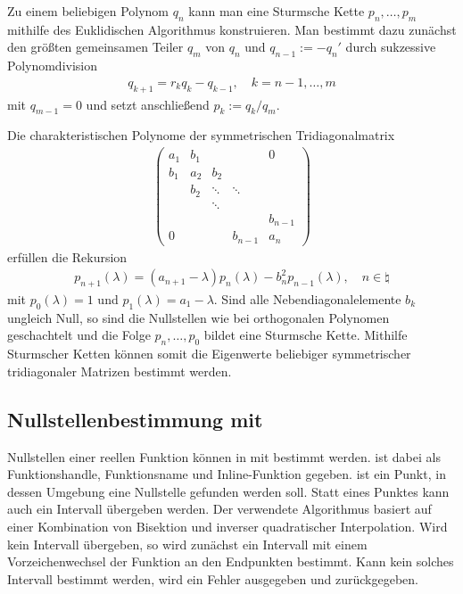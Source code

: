 \linie

Zu einem beliebigen Polynom $q_n$ kann man eine Sturmsche Kette
$p_n, \dotsc, p_m$ mithilfe des Euklidischen Algorithmus konstruieren.
Man bestimmt dazu zunächst den größten gemeinsamen Teiler $q_m$ von $q_n$
und $q_{n-1} := -q_n'$ durch sukzessive Polynomdivision
\begin{align*}
    q_{k+1} = r_k q_k - q_{k-1}, \quad
    k = n - 1, \dotsc, m
\end{align*}
mit $q_{m-1} = 0$ und setzt anschließend $p_k := q_k / q_m$.

\linie

Die charakteristischen Polynome der symmetrischen Tridiagonalmatrix
\begin{align*}
    \begin{pmatrix}
        a_1 & b_1 & & & 0 \\
        b_1 & a_2 & b_2 \\
        & b_2 & \ddots & \ddots \\
        & & \ddots \\
        & & & & b_{n-1} \\
        0 & & & b_{n-1} & a_n
    \end{pmatrix}
\end{align*}
erfüllen die Rekursion
\begin{align*}
    p_{n+1}(\lambda) = (a_{n+1} - \lambda) p_n(\lambda) -
    b_n^2 p_{n-1}(\lambda), \quad
    n \in \natural
\end{align*}
mit $p_0(\lambda) = 1$ und $p_1(\lambda) = a_1 - \lambda$.
Sind alle Nebendiagonalelemente $b_k$ ungleich Null, so sind die Nullstellen
wie bei orthogonalen Polynomen geschachtelt und die Folge
$p_n, \dotsc, p_0$ bildet eine Sturmsche Kette.
Mithilfe Sturmscher Ketten können somit die Eigenwerte beliebiger
symmetrischer tridiagonaler Matrizen bestimmt werden.

\subsection{%
    Nullstellenbestimmung mit \matlab{}%
}

Nullstellen einer reellen Funktion  können in \matlab{} mit
 bestimmt werden.
 ist dabei als Funktionshandle, Funktionsname und Inline-Funktion
gegeben.
 ist ein Punkt, in dessen Umgebung eine Nullstelle gefunden werden
soll.
Statt eines Punktes kann auch ein Intervall \code{[a, b]} übergeben werden.
Der verwendete Algorithmus basiert auf einer Kombination von Bisektion und
inverser quadratischer Interpolation.
Wird kein Intervall übergeben, so wird zunächst ein Intervall mit einem
Vorzeichenwechsel der Funktion an den Endpunkten bestimmt.
Kann kein solches Intervall bestimmt werden, wird ein Fehler ausgegeben
und  zurückgegeben.


